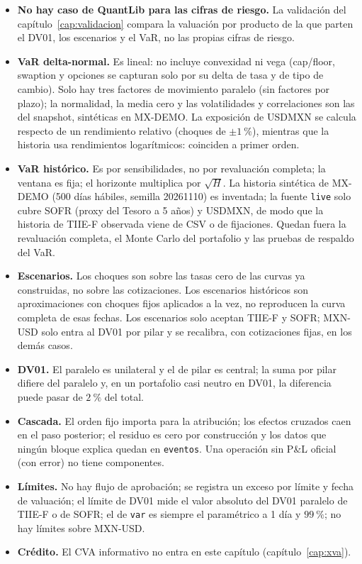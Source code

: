 \begin{limites}
  \begin{itemize}
    \item \textbf{No hay caso de QuantLib para las cifras de riesgo.} La validación del capítulo~\ref{cap:validacion} compara la valuación por producto de la que parten el DV01, los escenarios y el VaR, no las propias cifras de riesgo.
    \item \textbf{VaR delta-normal.} Es lineal: no incluye convexidad ni vega (cap/floor, swaption y opciones se capturan solo por su delta de tasa y de tipo de cambio). Solo hay tres factores de movimiento paralelo (sin factores por plazo); la normalidad, la media cero y las volatilidades y correlaciones son las del snapshot, sintéticas en MX-DEMO. La exposición de USDMXN se calcula respecto de un rendimiento relativo (choques de $\pm1~\%$), mientras que la historia usa rendimientos logarítmicos: coinciden a primer orden.
    \item \textbf{VaR histórico.} Es por sensibilidades, no por revaluación completa; la ventana es fija; el horizonte multiplica por $\sqrt H$. La historia sintética de MX-DEMO (500 días hábiles, semilla 20261110) es inventada; la fuente \texttt{live} solo cubre SOFR (proxy del Tesoro a 5 años) y USDMXN, de modo que la historia de TIIE-F observada viene de CSV o de fijaciones. Quedan fuera la revaluación completa, el Monte Carlo del portafolio y las pruebas de respaldo del VaR.
    \item \textbf{Escenarios.} Los choques son sobre las tasas cero de las curvas ya construidas, no sobre las cotizaciones. Los escenarios históricos son aproximaciones con choques fijos aplicados a la vez, no reproducen la curva completa de esas fechas. Los escenarios solo aceptan TIIE-F y SOFR; MXN-USD solo entra al DV01 por pilar y se recalibra, con cotizaciones fijas, en los demás casos.
    \item \textbf{DV01.} El paralelo es unilateral y el de pilar es central; la suma por pilar difiere del paralelo y, en un portafolio casi neutro en DV01, la diferencia puede pasar de $2~\%$ del total.
    \item \textbf{Cascada.} El orden fijo importa para la atribución; los efectos cruzados caen en el paso posterior; el residuo es cero por construcción y los datos que ningún bloque explica quedan en \texttt{eventos}. Una operación sin P\&L oficial (con error) no tiene componentes.
    \item \textbf{Límites.} No hay flujo de aprobación; se registra un exceso por límite y fecha de valuación; el límite de DV01 mide el valor absoluto del DV01 paralelo de TIIE-F o de SOFR; el de \texttt{var} es siempre el paramétrico a 1 día y $99~\%$; no hay límites sobre MXN-USD.
    \item \textbf{Crédito.} El CVA informativo no entra en este capítulo (capítulo~\ref{cap:xva}).
  \end{itemize}
\end{limites}

